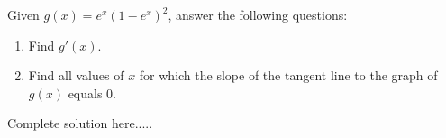 \begin{example}
Given $g(x)=e^x(1-e^x)^2$, answer the following questions:
\renewcommand{\labelenumi}{\textbf{(\alph{enumi})}}
\begin{enumerate}[leftmargin=*]
\item Find $g'(x)$.
\item Find all values of $x$ for which the slope of the tangent line to the graph of $g(x)$ equals 0.
\end{enumerate}
    \begin{sol}
    \end{sol}
    \begin{solL}
    Complete solution here.....
    
    \end{solL}
    
\end{example}
\newpage
